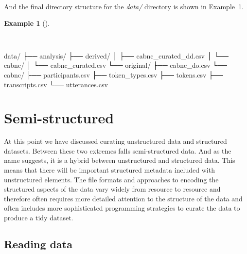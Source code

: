 \documentclass[
  letterpaper,
  DIV=11,
  numbers=noendperiod]{scrreport}
\newenvironment{Shaded}{\begin{snugshade}}{\end{snugshade}}
\newcommand{\ExtensionTok}[1]{\textcolor[rgb]{0.00,0.00,0.00}{#1}}
\newcommand{\NormalTok}[1]{\textcolor[rgb]{0.00,0.00,0.00}{#1}}
\theoremstyle{definition}
\newtheorem{example}{Example}[chapter]
\theoremstyle{remark}
\begin{document}
And the final directory structure for the \emph{data/} directory is
shown in Example~\ref{exm-cd-cabnc-final-dir}.

\begin{example}[]\protect\hypertarget{exm-cd-cabnc-final-dir}{}\label{exm-cd-cabnc-final-dir}

~

\begin{Shaded}
\begin{Highlighting}[]
\ExtensionTok{data/}
\ExtensionTok{├──}\NormalTok{ analysis/}
\ExtensionTok{├──}\NormalTok{ derived/}
\ExtensionTok{│}\NormalTok{   ├── cabnc\_curated\_dd.csv}
\ExtensionTok{│}\NormalTok{   └── cabnc/}
\ExtensionTok{│}\NormalTok{       └── cabnc\_curated.csv}
\ExtensionTok{└──}\NormalTok{ original/}
    \ExtensionTok{├──}\NormalTok{ cabnc\_do.csv}
    \ExtensionTok{└──}\NormalTok{ cabnc/}
        \ExtensionTok{├──}\NormalTok{ participants.csv}
        \ExtensionTok{├──}\NormalTok{ token\_types.csv}
        \ExtensionTok{├──}\NormalTok{ tokens.csv}
        \ExtensionTok{├──}\NormalTok{ transcripts.csv}
        \ExtensionTok{└──}\NormalTok{ utterances.csv}
\end{Highlighting}
\end{Shaded}

\end{example}

\hypertarget{semi-structured}{%
\section{Semi-structured}\label{semi-structured}}

At this point we have discussed curating unstructured data and
structured datasets. Between these two extremes falls semi-structured
data. And as the name suggests, it is a hybrid between unstructured and
structured data. This means that there will be important structured
metadata included with unstructured elements. The file formats and
approaches to encoding the structured aspects of the data vary widely
from resource to resource and therefore often requires more detailed
attention to the structure of the data and often includes more
sophisticated programming strategies to curate the data to produce a
tidy dataset.

\hypertarget{reading-data-2}{%
\subsection{Reading data}\label{reading-data-2}}
\end{document}
